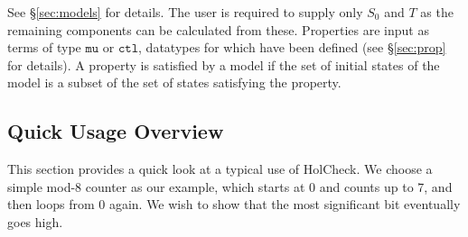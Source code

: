 \documentclass[12pt,fleqn]{article}
\newcommand{\hc}{HolCheck}
\begin{document}
See \S\ref{sec:models} for details. The user is required to supply only \( S_0 \) and \( T \) as the remaining components can be calculated from these. Properties are input as \HOL{} terms of type \(\mathtt{mu}\) or \(\mathtt{ctl}\), \HOL{} datatypes for which have been defined (see \S\ref{sec:prop} for details). A property is satisfied by a model if the set of initial states of the model is a subset of the set of states satisfying the property.

\subsection{Quick Usage Overview}

This section provides a quick look at a typical use of \hc{}. We choose a simple mod-8 counter as our example, which starts at 0 and counts up to 7, and then loops from 0 again. We wish to show that the most significant bit eventually goes high.
\end{document}
